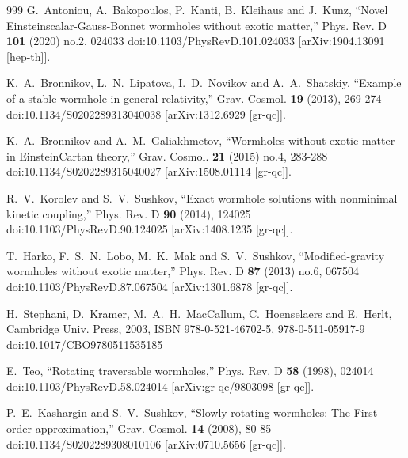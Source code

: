 \documentclass[aps,preprint,groupedaddress,nofootinbib,superscriptaddress,showkeys,showpacs,eqsecnum,amsmath,amssymb]{revtex4-1}
\begin{document}
\begin{thebibliography}{999}
G.~Antoniou, A.~Bakopoulos, P.~Kanti, B.~Kleihaus and J.~Kunz,
``Novel Einstein\textendash{}scalar-Gauss-Bonnet wormholes without exotic matter,''
Phys. Rev. D \textbf{101} (2020) no.2, 024033
doi:10.1103/PhysRevD.101.024033
[arXiv:1904.13091 [hep-th]].



K.~A.~Bronnikov, L.~N.~Lipatova, I.~D.~Novikov and A.~A.~Shatskiy,
``Example of a stable wormhole in general relativity,''
Grav. Cosmol. \textbf{19} (2013), 269-274
doi:10.1134/S0202289313040038
[arXiv:1312.6929 [gr-qc]].

K.~A.~Bronnikov and A.~M.~Galiakhmetov,
``Wormholes without exotic matter in Einstein\textendash{}Cartan theory,''
Grav. Cosmol. \textbf{21} (2015) no.4, 283-288
doi:10.1134/S0202289315040027
[arXiv:1508.01114 [gr-qc]].


R.~V.~Korolev and S.~V.~Sushkov,
``Exact wormhole solutions with nonminimal kinetic coupling,''
Phys. Rev. D \textbf{90} (2014), 124025
doi:10.1103/PhysRevD.90.124025
[arXiv:1408.1235 [gr-qc]].


T.~Harko, F.~S.~N.~Lobo, M.~K.~Mak and S.~V.~Sushkov,
``Modified-gravity wormholes without exotic matter,''
Phys. Rev. D \textbf{87} (2013) no.6, 067504
doi:10.1103/PhysRevD.87.067504
[arXiv:1301.6878 [gr-qc]].

H.~Stephani, D.~Kramer, M.~A.~H.~MacCallum, C.~Hoenselaers and E.~Herlt,
Cambridge Univ. Press, 2003,
ISBN 978-0-521-46702-5, 978-0-511-05917-9
doi:10.1017/CBO9780511535185

E.~Teo,
``Rotating traversable wormholes,''
Phys. Rev. D \textbf{58} (1998), 024014
doi:10.1103/PhysRevD.58.024014
[arXiv:gr-qc/9803098 [gr-qc]].



P.~E.~Kashargin and S.~V.~Sushkov,
``Slowly rotating wormholes: The First order approximation,''
Grav. Cosmol. \textbf{14} (2008), 80-85
doi:10.1134/S0202289308010106
[arXiv:0710.5656 [gr-qc]].


\end{thebibliography}
\end{document}
